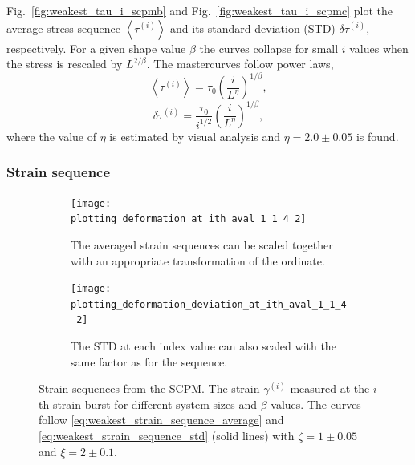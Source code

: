 Fig.~\ref{fig:weakest_tau_i_scpmb} and Fig.~\ref{fig:weakest_tau_i_scpmc} plot the average stress sequence $\left\langle {{\tau ^{\left( i \right)}}} \right\rangle $ and its standard deviation (STD)  $\delta {\tau ^{\left( i \right)}}$, respectively. For a given shape value $\beta$ the curves collapse for small $i$ values when the stress is rescaled by ${L^{2/\beta }}$. The mastercurves follow power laws,
\begin{equation} \label{eq:weakest_stress_sequence_average}
\left\langle {{\tau ^{\left( i \right)}}} \right\rangle  = {\tau _0}{\left( {\frac{i}{{{L^\eta }}}} \right)^{1/\beta }},
\end{equation}
\begin{equation} \label{eq:weakest_stress_sequence_std}
\delta {\tau ^{\left( i \right)}} = \frac{{{\tau _0}}}{{{i^{1/2}}}}{\left( {\frac{i}{{{L^\eta }}}} \right)^{1/\beta }},
\end{equation}
where the value of $\eta $ is estimated by visual analysis and $\eta =2.0\pm0.05$ is found.



\subsubsection{Strain sequence}


\begin{figure}[htbp!] 
  \centering
  \begin{subfigure}[b]{0.48\textwidth}
    \texttt{[image: plotting\_deformation\_at\_ith\_aval\_1\_1\_4\_2]}
    \caption{The averaged strain sequences can be scaled together with an appropriate transformation of the ordinate.}
    \label{fig:weakest_gamma_i_scpma}   
  \end{subfigure}           \hspace{0.01\textwidth}
  \begin{subfigure}[b]{0.48\textwidth}
    \texttt{[image: plotting\_deformation\_deviation\_at\_ith\_aval\_1\_1\_4\_2]}
    \caption{The STD at each index value can also scaled with the same factor as for the sequence.}
    \label{fig:weakest_gamma_i_scpmb}   
  \end{subfigure}             
  \caption[Analysis of the strain sequences for SCPM]{Strain sequences from the SCPM. The strain $\gamma^{(i)}$ measured at the $i$th strain burst for different system sizes and $\beta$ values. The curves follow \cref{eq:weakest_strain_sequence_average} and \cref{eq:weakest_strain_sequence_std} (solid lines) with $\zeta=1 \pm 0.05$ and $\xi=2 \pm 0.1$. }
  \label{fig:weakest_gamma_i_scpm}
\end{figure}


